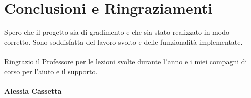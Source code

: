 \documentclass[12pt]{article}
\begin{document}
\section{Conclusioni e Ringraziamenti}
Spero che il progetto sia di gradimento e che sia stato realizzato in modo corretto. Sono soddisfatta del lavoro svolto e delle funzionalità implementate. \\ \\
Ringrazio il Professore per le lezioni svolte durante l'anno e i miei compagni di corso per l'aiuto e il supporto. \\ \\

\textbf{Alessia Cassetta}
\end{document}

